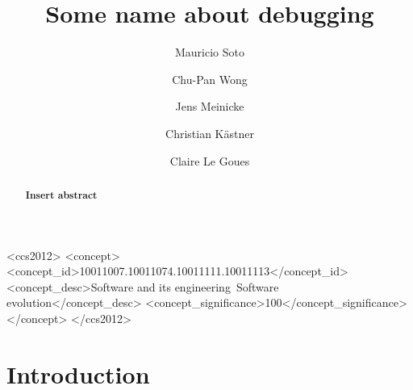 \documentclass[sigconf]{acmart}
\newcommand{\todo}[1]
  {{\scriptsize \textbf{\color{red} {#1}}}}
\begin{document}
\title{Some name about debugging}


\author{Mauricio Soto}

\author{Chu-Pan Wong}

\author{Jens Meinicke}

\author{Christian K\"{a}stner}

\author{Claire Le Goues}


\renewcommand{\shortauthors}{B. Trovato et al.}


\begin{abstract}
\todo{Insert abstract}
\end{abstract}

%
%
\begin{CCSXML}
<ccs2012>
<concept>
<concept_id>10011007.10011074.10011111.10011113</concept_id>
<concept_desc>Software and its engineering~Software evolution</concept_desc>
<concept_significance>100</concept_significance>
</concept>
</ccs2012>
\end{CCSXML}





\maketitle

\section{Introduction}
\end{document}
